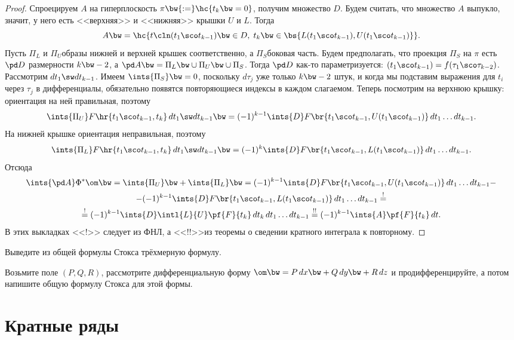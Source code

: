 \documentclass[a4paper]{article}
\begin{document}
\begin{proof}
Спроецируем $A$ на гиперплоскость $\pi \bw{:=} \hc{t_k \bw= 0}$, получим множество $D$. Будем считать,
что множество $A$ выпукло,
значит, у него есть <<верхняя>> и <<нижняя>> крышки $U$ и $L$. Тогда
$$A \bw= \hc{t\cln (t_1\sco t_{k-1}) \bw\in D,\; t_k \bw\in \bs{L(t_1\sco t_{k-1}), U(t_1\sco t_{k-1})}}.$$
Пусть $\Pi_L$ и $\Pi_U$\т образы нижней и верхней крышек соответственно, а $\Pi_S$\т боковая часть. Будем
предполагать, что проекция $\Pi_S$ на $\pi$ есть $\pd D$ размерности $k\bw-2$, а $\pd A \bw= \Pi_L \bw\cup
\Pi_U \bw\cup \Pi_S$. Тогда $\pd D$ как-то параметризуется: $(t_1\sco t_{k-1}) = f(\tau_1\sco \tau_{k-2})$.
Рассмотрим $d t_1\sw d t_{k-1}$. Имеем $\ints{\Pi_S} \bw= 0$, поскольку $d \tau_j$ уже только $k\bw-2$
штук, и когда мы подставим выражения для $t_i$ через $\tau_j$ в дифференциалы, обязательно появятся
повторяющиеся индексы в каждом слагаемом. Теперь посмотрим на верхнюю крышку: ориентация на ней правильная,
поэтому
$$\ints{\Pi_U}F\hr{t_1\sco t_{k-1}, t_k}\,d t_1\sw d t_{k-1} \bw=
(-1)^{k-1}\ints{D}F\br{t_1\sco t_{k-1}, U(t_1\sco t_{k-1})}\,d t_1\dots d t_{k-1}.$$ На нижней крышке
ориентация неправильная, поэтому
$$\ints{\Pi_L}F\hr{t_1\sco t_{k-1}, t_k}\,d t_1\sw d t_{k-1} \bw=
(-1)^k\ints{D}F\br{t_1\sco t_{k-1}, L(t_1\sco t_{k-1})}\,d t_1\dots d t_{k-1}.$$ Отсюда
\begin{multline*}
\ints{\pd A}\Phi^*\om \bw= \ints{\Pi_U} \bw+ \ints{\Pi_L} \bw=
(-1)^{k-1}\ints{D}F\br{t_1\sco t_{k-1}, U(t_1\sco t_{k-1})}\,d t_1\dots d t_{k-1} -\\
-(-1)^{k-1}\ints{D}F\br{t_1\sco t_{k-1}, L(t_1\sco t_{k-1})}\,d t_1\dots d t_{k-1}\stackrel{!}{=}\\
\stackrel{!}{=}(-1)^{k-1}\ints{D}\intl{L}{U} \pf{F}{t_k} \,d t_k \,d t_1\dots d t_{k-1} \stackrel{!!}{=}
(-1)^{k-1}\ints{A} \pf{F}{t_k} \,d t.
\end{multline*}
В этих выкладках <<!>> следует из ФНЛ, а <<!!>>\т из теоремы о сведении кратного интеграла к повторному.
\end{proof}

\begin{problem}
Выведите из общей формулы Стокса трёхмерную формулу.
\end{problem}
\begin{hint}
Возьмите поле $(P, Q, R)$,
рассмотрите дифференциальную форму $\om \bw= P\,d x \bw+ Q\,d y \bw+ R\,d z$ и продифференцируйте,
а потом напишите общую формулу Стокса для этой формы.
\end{hint}

\section{Кратные ряды}
\end{document}
